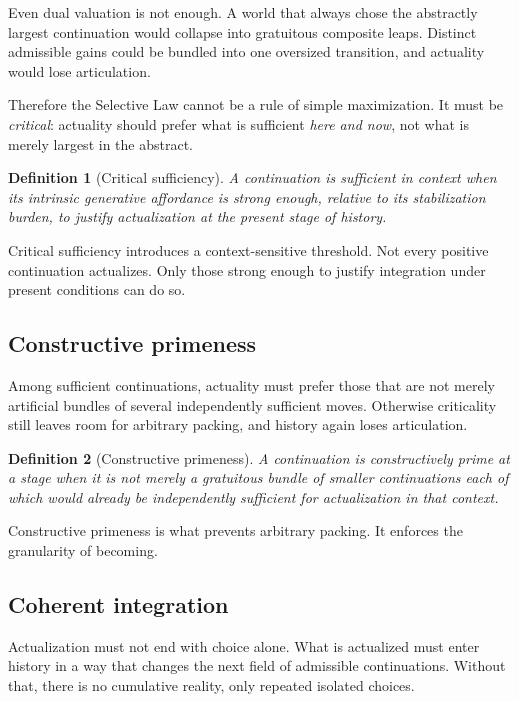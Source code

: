 \documentclass[11pt]{article}
\theoremstyle{foundation}
\newtheorem{definition}{Definition}
\begin{document}
Even dual valuation is not enough. A world that always chose the abstractly largest continuation would collapse into gratuitous composite leaps. Distinct admissible gains could be bundled into one oversized transition, and actuality would lose articulation.

Therefore the Selective Law cannot be a rule of simple maximization. It must be \emph{critical}: actuality should prefer what is sufficient \emph{here and now}, not what is merely largest in the abstract.

\begin{definition}[Critical sufficiency]
A continuation is sufficient in context when its intrinsic generative affordance is strong enough, relative to its stabilization burden, to justify actualization at the present stage of history.
\end{definition}

Critical sufficiency introduces a context-sensitive threshold. Not every positive continuation actualizes. Only those strong enough to justify integration under present conditions can do so.

\subsection{Constructive primeness}

Among sufficient continuations, actuality must prefer those that are not merely artificial bundles of several independently sufficient moves. Otherwise criticality still leaves room for arbitrary packing, and history again loses articulation.

\begin{definition}[Constructive primeness]
A continuation is constructively prime at a stage when it is not merely a gratuitous bundle of smaller continuations each of which would already be independently sufficient for actualization in that context.
\end{definition}

Constructive primeness is what prevents arbitrary packing. It enforces the granularity of becoming.

\subsection{Coherent integration}

Actualization must not end with choice alone. What is actualized must enter history in a way that changes the next field of admissible continuations. Without that, there is no cumulative reality, only repeated isolated choices.
\end{document}
